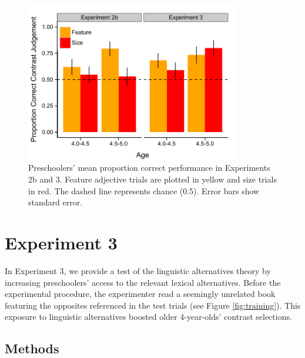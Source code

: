 \documentclass[10pt,letterpaper]{article}
\begin{document}
\begin{figure}[t] 
  \begin{center} 
    \includegraphics[width=3.7in]{figures/results_expt2b&3_n75.pdf} 
    \caption{\label{fig:kids2} Preschoolers' mean proportion correct performance in Experiments 2b and 3.  Feature adjective trials are plotted in yellow and size trials in red.
The dashed line represents chance (0.5). Error bars show standard error.}
  \end{center} 
\end{figure}

\section{Experiment 3} 




In Experiment 3, we provide a test of the linguistic alternatives theory by increasing preschoolers' access to the relevant lexical alternatives.  Before the experimental procedure, the experimenter read a seemingly unrelated book featuring the opposites referenced in the test trials (see Figure \ref{fig:training}).  This exposure to linguistic alternatives boosted older 4-year-olds' contrast selections. 

\subsection{Methods}
\end{document}

